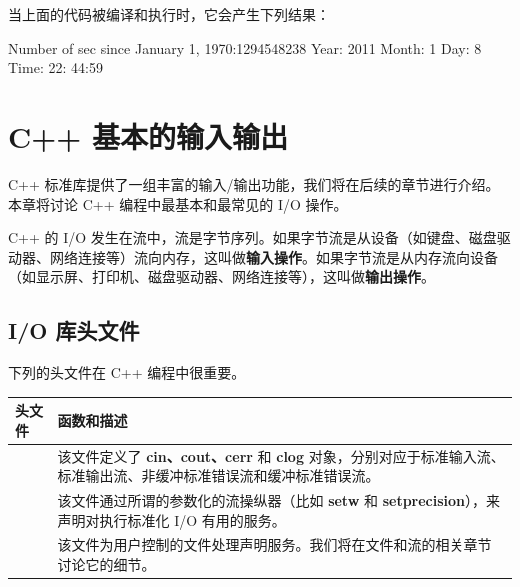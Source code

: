 \documentclass[
]{article}
\newenvironment{Shaded}{}{}
\newcommand{\DecValTok}[1]{\textcolor[rgb]{0.25,0.63,0.44}{#1}}
\newcommand{\NormalTok}[1]{#1}
\newcommand{\OperatorTok}[1]{\textcolor[rgb]{0.40,0.40,0.40}{#1}}
\begin{document}
当上面的代码被编译和执行时，它会产生下列结果：

\begin{Shaded}
\begin{Highlighting}[]
\NormalTok{Number of sec since January }\DecValTok{1}\OperatorTok{,} \DecValTok{1970}\OperatorTok{:}\DecValTok{1294548238}
\NormalTok{Year}\OperatorTok{:} \DecValTok{2011}
\NormalTok{Month}\OperatorTok{:} \DecValTok{1}
\NormalTok{Day}\OperatorTok{:} \DecValTok{8}
\NormalTok{Time}\OperatorTok{:} \DecValTok{22}\OperatorTok{:} \DecValTok{44}\OperatorTok{:}\DecValTok{59}
\end{Highlighting}
\end{Shaded}

\hypertarget{c-ux57faux672cux7684ux8f93ux5165ux8f93ux51fa}{%
\section{C++
基本的输入输出}\label{c-ux57faux672cux7684ux8f93ux5165ux8f93ux51fa}}

C++
标准库提供了一组丰富的输入/输出功能，我们将在后续的章节进行介绍。本章将讨论
C++ 编程中最基本和最常见的 I/O 操作。

C++ 的 I/O
发生在流中，流是字节序列。如果字节流是从设备（如键盘、磁盘驱动器、网络连接等）流向内存，这叫做\textbf{输入操作}。如果字节流是从内存流向设备（如显示屏、打印机、磁盘驱动器、网络连接等），这叫做\textbf{输出操作}。

\hypertarget{io-ux5e93ux5934ux6587ux4ef6}{%
\subsection{I/O 库头文件}\label{io-ux5e93ux5934ux6587ux4ef6}}

下列的头文件在 C++ 编程中很重要。

\begin{longtable}[]{@{}ll@{}}
\toprule
头文件 & 函数和描述 \\
\midrule
\endhead
& 该文件定义了 \textbf{cin、cout、cerr} 和 \textbf{clog}
对象，分别对应于标准输入流、标准输出流、非缓冲标准错误流和缓冲标准错误流。 \\
& 该文件通过所谓的参数化的流操纵器（比如 \textbf{setw} 和
\textbf{setprecision}），来声明对执行标准化 I/O 有用的服务。 \\
&
该文件为用户控制的文件处理声明服务。我们将在文件和流的相关章节讨论它的细节。 \\
\bottomrule
\end{longtable}
\end{document}
